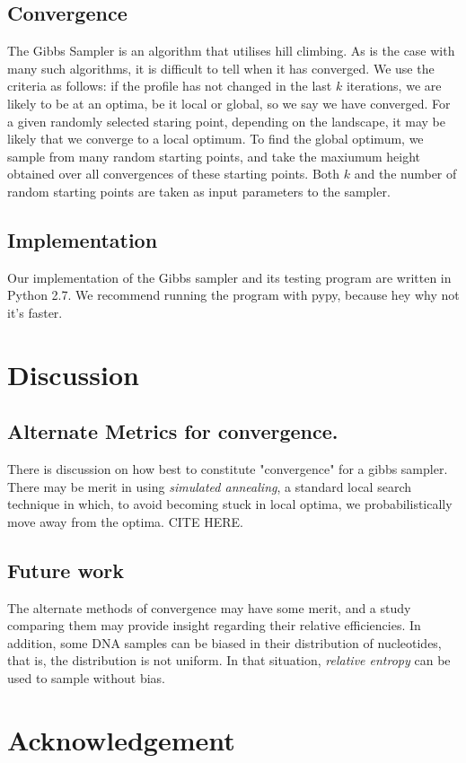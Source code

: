 \documentclass{bioinfo}
\begin{document}
\begin{methods}
\subsection{Convergence}
The Gibbs Sampler is an algorithm that utilises hill climbing. As is the case with many such algorithms, it is difficult to tell when it has converged. We use the criteria as follows: if the profile has not changed in the last $k$ iterations, we are likely to be at an optima, be it local or global, so we say we have converged. For a given randomly selected staring point, depending on the landscape, it may be likely that we converge to a local optimum. To find the global optimum, we sample from many random starting points, and take the maxiumum height obtained over all convergences of these starting points. Both $k$ and the number of random starting points are taken as input parameters to the sampler.

\subsection{Implementation}
Our implementation of the Gibbs sampler and its testing program are written in Python 2.7. We recommend running the program with pypy, because hey why not it's faster.

\end{methods}


\section{Discussion}
\subsection{Alternate Metrics for convergence.}
There is discussion on how best to constitute "convergence" for a gibbs sampler.
There may be merit in using \textit{simulated annealing}, a standard local search technique in which, to avoid becoming stuck in local optima, we probabilistically move away from the optima. CITE HERE. 
\subsection{Future work}
The alternate methods of convergence may have some merit, and a study comparing them may provide insight regarding their relative efficiencies. In addition, some DNA samples can be biased in their distribution of nucleotides, that is, the distribution is not uniform. In that situation, \textit{relative entropy} can be used to sample without bias.


\section*{Acknowledgement}

%
%
%
%
%
%
%
%
%


\begin{thebibliography}{}
\end{thebibliography}
\end{document}
